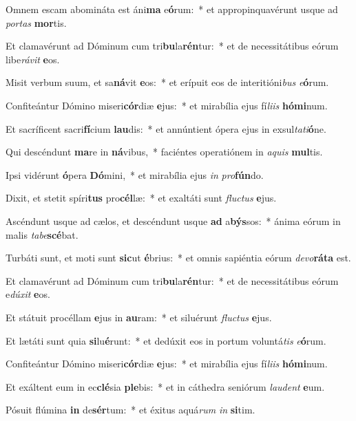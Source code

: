 \item Omnem escam abomináta est áni\textbf{ma} e\textbf{ó}rum:~* et appropinquavérunt usque ad \textit{por}\textit{tas} \textbf{mor}tis.
\item Et clamavérunt ad Dóminum cum tri\textbf{bu}la\textbf{rén}tur:~* et de necessitátibus eórum libe\textit{rá}\textit{vit} \textbf{e}os.
\item Misit verbum suum, et sa\textbf{ná}vit \textbf{e}os:~* et erípuit eos de interitióni\textit{bus} \textit{e}\textbf{ó}rum.
\item Confiteántur Dómino miseri\textbf{cór}diæ \textbf{e}jus:~* et mirabília ejus fí\textit{li}\textit{is} \textbf{hó}\textbf{mi}num.
\item Et sacríficent sacri\textbf{fí}cium \textbf{lau}dis:~* et annúntient ópera ejus in exsul\textit{ta}\textit{ti}\textbf{ó}ne.
\item Qui descéndunt \textbf{ma}re in \textbf{ná}vibus,~* faciéntes operatiónem in \textit{a}\textit{quis} \textbf{mul}tis.
\item Ipsi vidérunt \textbf{ó}pera \textbf{Dó}mini,~* et mirabília ejus \textit{in} \textit{pro}\textbf{fún}do.
\item Dixit, et stetit spíri\textbf{tus} pro\textbf{cél}læ:~* et exaltáti sunt \textit{fluc}\textit{tus} \textbf{e}jus.
\item Ascéndunt usque ad cælos, et descéndunt usque \textbf{ad} a\textbf{býs}sos:~* ánima eórum in malis \textit{ta}\textit{be}\textbf{scé}bat.
\item Turbáti sunt, et moti sunt \textbf{sic}ut \textbf{é}brius:~* et omnis sapiéntia eórum \textit{de}\textit{vo}\textbf{rá}\textbf{ta} est.
\item Et clamavérunt ad Dóminum cum tri\textbf{bu}la\textbf{rén}tur:~* et de necessitátibus eórum e\textit{dú}\textit{xit} \textbf{e}os.
\item Et státuit procéllam \textbf{e}jus in \textbf{au}ram:~* et siluérunt \textit{fluc}\textit{tus} \textbf{e}jus.
\item Et lætáti sunt quia \textbf{si}lu\textbf{é}runt:~* et dedúxit eos in portum voluntá\textit{tis} \textit{e}\textbf{ó}rum.
\item Confiteántur Dómino miseri\textbf{cór}diæ \textbf{e}jus:~* et mirabília ejus fí\textit{li}\textit{is} \textbf{hó}\textbf{mi}num.
\item Et exáltent eum in ec\textbf{clé}sia \textbf{ple}bis:~* et in cáthedra seniórum \textit{lau}\textit{dent} \textbf{e}um.
\item Pósuit flúmina \textbf{in} de\textbf{sér}tum:~* et éxitus aquá\textit{rum} \textit{in} \textbf{si}tim.
